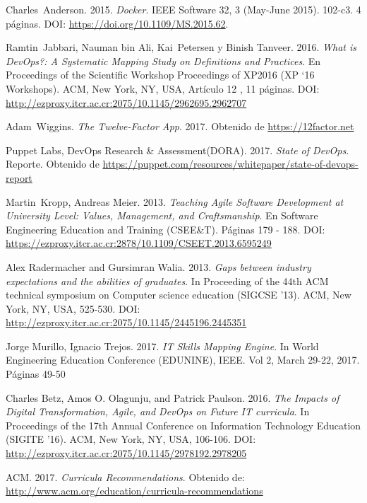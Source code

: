 \documentclass[journal]{IEEEtran}
\begin{document}
\begin{thebibliography}{1}
Charles~Anderson. 2015. \emph{Docker}. IEEE Software 32, 3 (May-June 2015). 102-c3. 4 páginas.  DOI: \url{https://doi.org/10.1109/MS.2015.62}.

Ramtin~Jabbari, Nauman bin Ali, Kai~Petersen y Binish Tanveer. 2016. \emph{What is DevOps?: A Systematic Mapping Study on Definitions and Practices}. En Proceedings of the Scientific Workshop Proceedings of XP2016 (XP `16 Workshops). ACM, New York, NY, USA, Artículo 12 , 11 páginas. DOI: \url{http://ezproxy.itcr.ac.cr:2075/10.1145/2962695.2962707} 

Adam~Wiggins. \emph{The Twelve-Factor App}. 2017. Obtenido de \url{https://12factor.net}

Puppet Labs, DevOps Research \& Assessment(DORA). 2017. \emph{State of DevOps}. Reporte. Obtenido de \url{https://puppet.com/resources/whitepaper/state-of-devops-report} 


Martin~Kropp, Andreas Meier. 2013. \emph{Teaching Agile Software Development at University Level: Values, Management, and Craftsmanship}. En Software Engineering Education and Training (CSEE\&T). Páginas 179 - 188. DOI: \url{https://ezproxy.itcr.ac.cr:2878/10.1109/CSEET.2013.6595249}

Alex Radermacher and Gursimran Walia. 2013. \emph{Gaps between industry expectations and the abilities of graduates}. In Proceeding of the 44th ACM technical symposium on Computer science education (SIGCSE '13). ACM, New York, NY, USA, 525-530. DOI: \url{http://ezproxy.itcr.ac.cr:2075/10.1145/2445196.2445351}

Jorge Murillo, Ignacio Trejos. 2017. \emph{IT Skills Mapping Engine}. In World Engineering Education Conference (EDUNINE), IEEE. Vol 2, March 29-22, 2017. Páginas 49-50


Charles Betz, Amos O. Olagunju, and Patrick Paulson. 2016. \emph{The Impacts of Digital Transformation, Agile, and DevOps on Future IT curricula}. In Proceedings of the 17th Annual Conference on Information Technology Education (SIGITE '16). ACM, New York, NY, USA, 106-106. DOI: \url{http://ezproxy.itcr.ac.cr:2075/10.1145/2978192.2978205}

ACM. 2017. \emph{Curricula Recommendations}. Obtenido de: \url{http://www.acm.org/education/curricula-recommendations}


\end{thebibliography}
\end{document}
